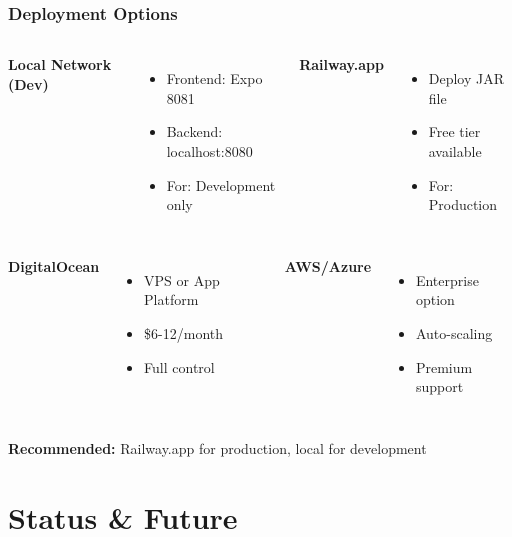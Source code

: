 \documentclass[11pt]{beamer}
\begin{document}
\begin{frame}
\frametitle{Deployment Options}
\begin{columns}[T]
\textbf{Local Network (Dev)}
\begin{itemize}
    \item Frontend: Expo 8081
    \item Backend: localhost:8080
    \item For: Development only
\end{itemize}

\textbf{Railway.app}
\begin{itemize}
    \item Deploy JAR file
    \item Free tier available
    \item For: Production
\end{itemize}
\end{columns}

\begin{columns}[T]
\textbf{DigitalOcean}
\begin{itemize}
    \item VPS or App Platform
    \item \$6-12/month
    \item Full control
\end{itemize}

\textbf{AWS/Azure}
\begin{itemize}
    \item Enterprise option
    \item Auto-scaling
    \item Premium support
\end{itemize}
\end{columns}

\vspace{1cm}
\textbf{Recommended:} Railway.app for production, local for development
\end{frame}

\section{Status \& Future}
\end{document}
